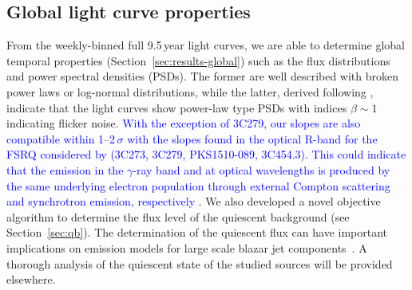 \documentclass[twocolumn,linenumbers]{aastex62}
\newcommand{\gray}{$\gamma$-ray\xspace}
\newcommand{\response}[1]{\textcolor{blue}{#1}}
\begin{document}
\subsection{Global light curve properties}
From the weekly-binned full 9.5\,year light curves, we are able to determine global temporal properties (Section~\ref{sec:results-global}) such as the flux distributions and power spectral densities (PSDs). 
The former are well described with broken power laws or log-normal distributions, while the latter, derived following \citet{2014MNRAS.445..437M}, indicate that the light curves show power-law type PSDs with indices $\beta\sim 1$ indicating flicker noise.
\response{
With the exception of 3C279, our slopes are also compatible within 1--2\,$\sigma$ with the slopes found in the optical R-band for the FSRQ considered by \citet{2012ApJ...749..191C} (3C273, 3C279, PKS1510-089, 3C454.3). 
This could indicate that the emission in the \gray band and at optical wavelengths is produced by the same underlying electron population through external Compton scattering and synchrotron emission, respectively \citep{2014ApJ...791...21F,2015ApJ...809...85F}.  
}
We also developed a novel objective algorithm to determine the flux level of the quiescent background (see Section~\ref{sec:qb}).
The determination of the quiescent flux can have important implications on emission models for large scale blazar jet components~\citep{2014ApJ...780L..27M}.
A thorough analysis of the quiescent state of the studied sources will be provided elsewhere. 
\end{document}
